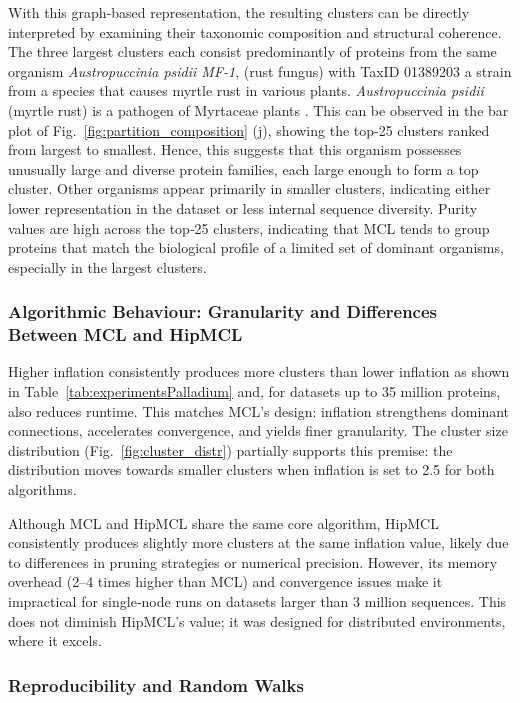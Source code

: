 With this graph‑based representation, the resulting clusters can be directly
interpreted by examining their taxonomic composition and structural coherence.
The three largest clusters each consist predominantly of proteins from the same
organism \textit{Austropuccinia psidii MF-1}, (rust fungus) with TaxID 01389203
a strain from a species that causes myrtle rust in various plants.
\textit{Austropuccinia psidii} (myrtle rust) is a pathogen of Myrtaceae plants
\cite{psidii}. This can be observed in the bar plot of
Fig.~\ref{fig:partition_composition} (j), showing the top-25 clusters ranked
from largest to smallest. Hence, this suggests that this organism possesses
unusually large and diverse protein families, each large enough to form a top
cluster. Other organisms appear primarily in smaller clusters, indicating
either lower representation in the dataset or less internal sequence diversity.
Purity values are high across the top‑25 clusters, indicating that MCL tends to
group proteins that match the biological profile of a limited set of dominant
organisms, especially in the largest clusters.

\subsubsection*{Algorithmic Behaviour: Granularity and Differences Between MCL and HipMCL}

Higher inflation consistently produces more clusters than lower inflation as
shown in Table~\ref{tab:experimentsPalladium} and, for datasets up to 35
million proteins, also reduces runtime. This matches MCL's design: inflation
strengthens dominant connections, accelerates convergence, and yields finer
granularity. The cluster size distribution (Fig.~\ref{fig:cluster_distr})
partially supports this premise: the distribution moves towards smaller
clusters when inflation is set to 2.5 for both algorithms.

Although MCL and HipMCL share the same core algorithm, HipMCL consistently
produces slightly more clusters at the same inflation value, likely due to
differences in pruning strategies or numerical precision. However, its memory
overhead (2–4 times higher than MCL) and convergence issues make it impractical
for single‑node runs on datasets larger than 3 million sequences. This does not
diminish HipMCL's value; it was designed for distributed environments, where it
excels.

\subsubsection*{Reproducibility and Random Walks}

